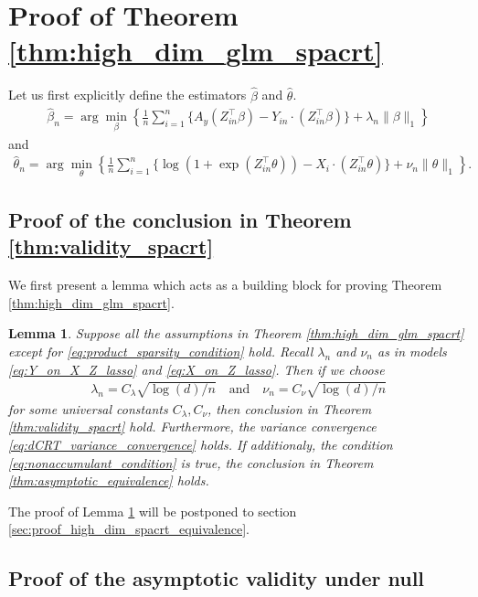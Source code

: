 \documentclass[12pt]{article}
\newtheorem{lemma}{Lemma}
\theoremstyle{definition}
\newcommand{\srz}{Z}									%
\begin{document}
\section{Proof of Theorem \ref{thm:high_dim_glm_spacrt}}

Let us first explicitly define the estimators $\widehat{\beta}$ and $\widehat{\theta}$.
\begin{align}\label{eq:Y_on_X_Z_lasso}
  \widehat{\beta}_n=\arg\min_{\beta}\left\{\frac{1}{n}\sum_{i=1}^n \{A_y(\srz_{in}^\top\beta)-Y_{in}\cdot (\srz_{in}^\top\beta)\}+\lambda_n\|\beta\|_1\right\}
\end{align}
and 
\begin{align}\label{eq:X_on_Z_lasso}
  \widehat{\theta}_n=\arg\min_{\theta}\left\{\frac{1}{n}\sum_{i=1}^n \{\log(1 + \exp(\srz_{in}^\top\theta))-X_i\cdot (\srz_{in}^\top\theta)\}+\nu_n\|\theta\|_1\right\}.
\end{align}


\subsection{Proof of the conclusion in Theorem \ref{thm:validity_spacrt}}

We first present a lemma which acts as a building block for proving Theorem \ref{thm:high_dim_glm_spacrt}.


\begin{lemma}\label{lem:high_dim_glm_spacrt}
  Suppose all the assumptions in Theorem \ref{thm:high_dim_glm_spacrt} except for \eqref{eq:product_sparsity_condition} hold. Recall $\lambda_n$ and $\nu_n$ as in models \eqref{eq:Y_on_X_Z_lasso} and \eqref{eq:X_on_Z_lasso}. Then if we choose 
  \begin{align*}
    \lambda_n=C_{\lambda} \sqrt{\log(d)/n}\quad\text{and}\quad\nu_n=C_{\nu}\sqrt{\log(d)/n}
  \end{align*}
  for some universal constants $C_\lambda,C_\nu$, then conclusion in Theorem \ref{thm:validity_spacrt} hold. Furthermore, the variance convergence \eqref{eq:dCRT_variance_convergence} holds. If additionaly, the condition \eqref{eq:nonaccumulant_condition} is true, the conclusion in Theorem \ref{thm:asymptotic_equivalence} holds.
\end{lemma}
\noindent The proof of Lemma \ref{lem:high_dim_glm_spacrt} will be postponed to section \ref{sec:proof_high_dim_spacrt_equivalence}. 

\subsection{Proof of the asymptotic validity under null}
\end{document}
